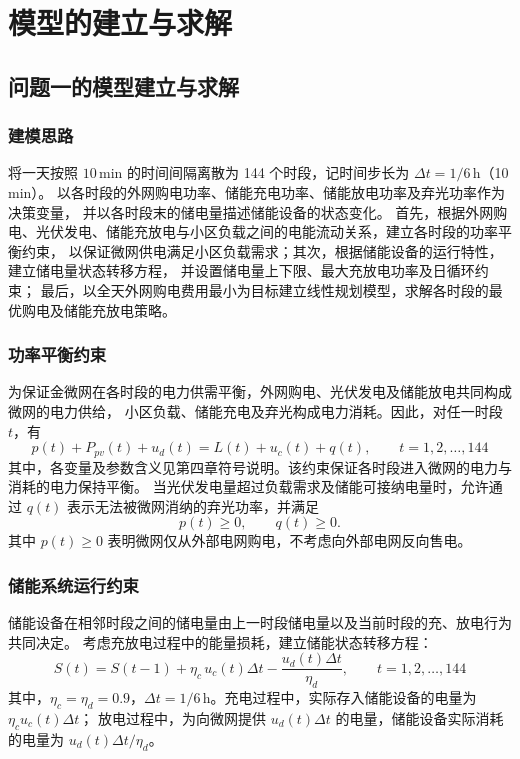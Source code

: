 
\section{模型的建立与求解}
\subsection{问题一的模型建立与求解}

\subsubsection{建模思路}
将一天按照 $10\,$min 的时间间隔离散为 144 个时段，记时间步长为 $\Delta t=1/6$\,h（10\,min）。
以各时段的外网购电功率、储能充电功率、储能放电功率及弃光功率作为决策变量，
并以各时段末的储电量描述储能设备的状态变化。
首先，根据外网购电、光伏发电、储能充放电与小区负载之间的电能流动关系，建立各时段的功率平衡约束，
以保证微网供电满足小区负载需求；其次，根据储能设备的运行特性，建立储电量状态转移方程，
并设置储电量上下限、最大充放电功率及日循环约束；
最后，以全天外网购电费用最小为目标建立线性规划模型，求解各时段的最优购电及储能充放电策略。

\subsubsection{功率平衡约束}
为保证金微网在各时段的电力供需平衡，外网购电、光伏发电及储能放电共同构成微网的电力供给，
小区负载、储能充电及弃光构成电力消耗。因此，对任一时段 $t$，有
\begin{equation}
p(t)+P_{pv}(t)+u_d(t)=L(t)+u_c(t)+q(t),\qquad t=1,2,\dots,144
\end{equation}
其中，各变量及参数含义见第四章符号说明。该约束保证各时段进入微网的电力与消耗的电力保持平衡。
当光伏发电量超过负载需求及储能可接纳电量时，允许通过 $q(t)$ 表示无法被微网消纳的弃光功率，并满足
\begin{equation}
p(t)\ge 0,\qquad q(t)\ge 0 .
\end{equation}
其中 $p(t)\ge 0$ 表明微网仅从外部电网购电，不考虑向外部电网反向售电。

\subsubsection{储能系统运行约束}
储能设备在相邻时段之间的储电量由上一时段储电量以及当前时段的充、放电行为共同决定。
考虑充放电过程中的能量损耗，建立储能状态转移方程：
\begin{equation}
S(t)=S(t-1)+\eta_c\,u_c(t)\Delta t-\dfrac{u_d(t)\Delta t}{\eta_d},\qquad t=1,2,\dots,144
\end{equation}
其中，$\eta_c=\eta_d=0.9$，$\Delta t=1/6$\,h。充电过程中，实际存入储能设备的电量为 $\eta_c u_c(t)\Delta t$；
放电过程中，为向微网提供 $u_d(t)\Delta t$ 的电量，储能设备实际消耗的电量为 $u_d(t)\Delta t/\eta_d$。

